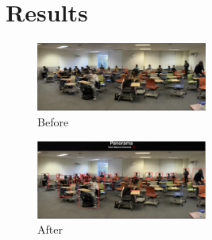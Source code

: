 \section{Results}
\label{sec:results}


\begin{figure}[h]
    \centering
    \includegraphics[width=0.5\textwidth]{images/Before.png}
    \caption{Before}
    \label{fig:before}
\end{figure}

\begin{figure}[h]
    \centering
    \includegraphics[width=0.5\textwidth]{images/After.png}
    \caption{After}
    \label{fig:after}
\end{figure}

